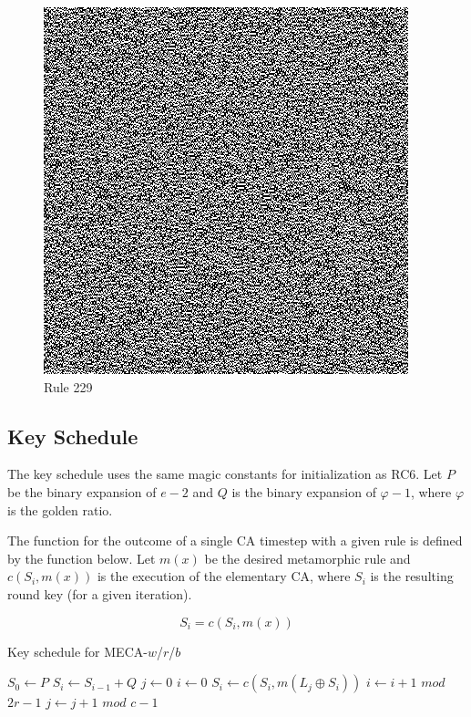 \documentclass{article}
\begin{document}
\begin{figure}[H]
\begin{center}
\begin{minipage}{0.48\textwidth}
      \caption{Rule 229}
      \label{fig:figure10}
      \centering
      \includegraphics[scale=.5]{229.png}
    \end{minipage}
  \end{center}
\end{figure}

\subsection{Key Schedule}

The key schedule uses the same magic constants for initialization as RC6. Let $P$ be the binary expansion of $e-2$ and $Q$ is the binary expansion of $\varphi-1$, where $\varphi$ is the golden ratio.

The function for the outcome of a single CA timestep with a given rule is defined by the function below. Let $m(x)$ be the desired metamorphic rule and $c(S_i, m(x))$ is the execution of the elementary CA, where $S_i$ is the resulting round key (for a given iteration).

$$
 S_i = c(S_i, m(x)) 
$$

\begin{algorithm}[H]
  \begin{algorithmic}
    \caption{Key schedule for MECA-$w$/$r$/$b$}\label{alg:schedule}
    \Input
    \EndInput
    \Output
    \EndOutput
    \State $S_0 \gets P$
      \State $S_i \gets S_{i-1} + Q$
    \EndFor
    \State $j \gets 0$
    \State $i \gets 0$
      \State $S_i \gets c(S_i, m(L_j \oplus S_i))$ 
      \State $i \gets i+1$ $mod$ $2r-1$
      \State $j \gets j+1$ $mod$ $c-1$
    \EndFor
  \end{algorithmic}
\end{algorithm}
\end{document}
